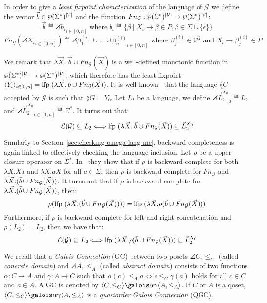 In order to give a \emph{least fixpoint characterization} of the language of $\mathcal{G}$
we define the vector $\vec{b} \in \powerset (\Sigma^*)^{|\mathcal{V}|}$ and
the function $Fn_{\mathcal{G}}: \powerset (\Sigma^*)^{|\mathcal{V}|} \rightarrow  \powerset (\Sigma^*)^{|\mathcal{V}|}$:
\[  \vec{b} \eqdef \angles{b_i}_{i \in [0,n]}
\textrm{ where } b_i \eqdef \{\beta \;|\; X_i \rightarrow \beta \in P, \beta \in \Sigma \cup \{\epsilon\} \}\]
\[ Fn_{\mathcal{G}}(\angles{X_i}_{i \in [0,n]}) \eqdef \angles{\beta_1^{(i)} \cup \dots \cup \beta_n^{(i)}}_{i \in [0,n]}
\textrm{ where } \beta_j^{(i)} \in \mathcal{V}^2 \textrm{ and } X_i \rightarrow \beta_j^{(i)} \in P\]

We remark that $\lambda \vec{X}. \; \vec{b} \cup Fn_{\mathcal{G}}(\vec{X})$ is a well-defined
monotonic function in $\powerset(\Sigma^*)^{|\mathcal{V}|} \rightarrow \powerset(\Sigma^*)^{|\mathcal{V}|}$,
which therefore has the least fixpoint
$\langle Y_i \rangle_{i \in [0,n]} = \textrm{lfp}\; (\lambda \vec{X}. \; \vec{b} \cup Fn_{\mathcal{G}}(\vec{X}))$.
It is well-known~\cite{ginsburg1962two} that the language $\lang{G}$
accepted by $\mathcal{G}$ is such that $\lang{G} = Y_0$.
Let $L_2$ be a language, we define $\angles{\vec{L}_2^{X_0}}_{0} \eqdef L_2$
and $\angles{\vec{L}^{X_0}_2}_{i \in [1,n]} \eqdef \Sigma^*$.
It turns out that:
\[ \mathcal{L}(\mathcal{G}) \subseteq L_2 \Longleftrightarrow \textrm{lfp}\;(\lambda \vec{X}. \; \vec{b} \cup
Fn_{\mathcal{G}}(\vec{X})) \subseteq \vec{L}_2^{X_0} \]

Similarly to Section~\ref{sec:checking-omega-lang-inc}, backward completeness
is again linked to effectively checking the language inclusion.
Let $\rho$ be a upper closure operator on $\Sigma^*$.
In~\cite{ganty2019language} they show that if $\rho$ is backward complete for
both $\lambda X.Xa$ and $\lambda X. aX$ for all $a \in \Sigma$, then $\rho$ is
backward complete for $Fn_{\mathcal{G}}$ and $\lambda \vec{X}. (\vec{b} \cup Fn_{\mathcal{G}}(\vec{X}))$.
It turns out that if $\rho$ is backward complete for $\lambda \vec{X}. (\vec{b} \cup Fn_{\mathcal{G}}(\vec{X}))$, then:
\[ \rho( \textrm{lfp}\; (\lambda \vec{X}. (\vec{b} \cup Fn_{\mathcal{G}}(\vec{X}))) ) = \textrm{lfp}\; (\lambda \vec{X}. \rho(\vec{b} \cup Fn_{\mathcal{G}}(\vec{X})))\]
Furthermore, if $\rho$ is backward complete for left and right concatenation
and $\rho(L_2)= L_2$, then we have that:
\[ \mathcal{L}(\mathcal{G}) \subseteq L_2 \Longleftrightarrow \textrm{lfp}\; (\lambda \vec{X}. \rho(\vec{b} \cup Fn_{\mathcal{G}}(\vec{X}))) \subseteq \vec{L}_2^{X_0} \]

We recall that a \emph{Galois Connection} (GC) between two posets
$\angles{C,\leq_C}$ (called \emph{concrete domain}) and $\angles{A, \leq_A}$
(called \emph{abstract domain}) consists of two functions
$\alpha : C \rightarrow A$ and $\gamma : A \rightarrow C$ such that
$\alpha(c) \leq_A a \Longleftrightarrow c \leq_C \gamma (a)$ holds for all
$c \in C$ and $a \in A$.
A GC is denoted by $\gc{C}{\leq_C}{A}{\leq_A}$.
If $C$ or $A$ is a qoset, $\gc{C}{\leq_C}{A}{\leq_A}$ is a
\emph{quasiorder Galois Connection} (QGC).


